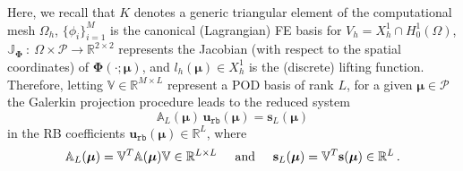 \documentclass[12pt, a4paper, twoside, openright]{report}
\numberwithin{equation}{chapter}
\theoremstyle{theorem}
\theoremstyle{definition}
\theoremstyle{remark}
\theoremstyle{proposition}
\numberwithin{figure}{chapter}
\newcommand{\bg}[1]{\boldsymbol{#1}}
\begin{document}
		Here, we recall that $K$ denotes a generic triangular element of the computational mesh $\Omega_h$, $\big\lbrace \phi_i \big\rbrace_{i = 1}^M$ is the canonical (Lagrangian) FE basis for $V_h = X_h^1 \cap H_0^1(\Omega)$, $\mathbb{J}_{\bg{\Phi}} ~ : ~ \Omega \times \mathcal{P} \rightarrow \mathbb{R}^{2 \times 2}$ represents the Jacobian (with respect to the spatial coordinates) of $\bg{\Phi}(\cdot; \bg{\mu})$, and $l_h(\bg{\mu}) \in X_h^1$ is the (discrete) lifting function. Therefore, letting $\mathbb{V} \in \mathbb{R}^{M \times L}$ represent a POD basis of rank $L$, for a given $\bg{\mu} \in \mathcal{P}$ the Galerkin projection procedure leads to the reduced system
		\begin{equation}
			\label{eq:poisson2d-1-podg-system}
			\mathbb{A}_L(\bg{\mu}) \, \mathbf{u}_{\texttt{rb}}(\bg{\mu}) = \mathbf{s}_L(\bg{\mu})
		\end{equation}
		in the RB coefficients $\mathbf{u}_{\texttt{rb}}(\bg{\mu}) \in \mathbb{R}^L$, where
		\begin{equation}
			\label{eq:poisson2d-1-podg-matrices}
			\mathbb{A}_L(\bg{\mu}) = \mathbb{V}^T \mathbb{A}(\bg{\mu}) \mathbb{V} \in \mathbb{R}^{L \times L} \hspace*{0.5cm} \text{and} \hspace*{0.5cm} \mathbf{s}_L(\bg{\mu}) = \mathbb{V}^T \mathbf{s}(\bg{\mu}) \in \mathbb{R}^L \, .
		\end{equation}
\end{document}
